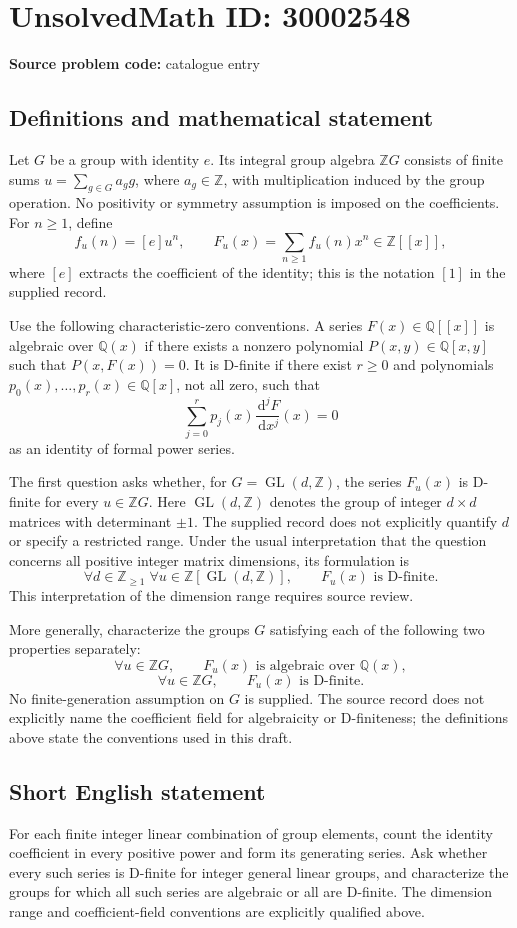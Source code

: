 \documentclass[11pt]{article}
\newcommand{\Z}{\mathbb{Z}}
\newcommand{\Q}{\mathbb{Q}}
\newcommand{\dd}{\,\mathrm{d}}
\begin{document}
\section*{UnsolvedMath ID: 30002548}
\textbf{Source problem code:} catalogue entry
\subsection{Definitions and mathematical statement}
Let \(G\) be a group with identity \(e\). Its integral group algebra \(\Z G\) consists of finite sums \(u=\sum_{g\in G}a_g g\), where \(a_g\in\Z\), with multiplication induced by the group operation. No positivity or symmetry assumption is imposed on the coefficients. For \(n\geq 1\), define
\[
f_u(n)=[e]u^n,\qquad F_u(x)=\sum_{n\geq 1}f_u(n)x^n\in\Z[[x]],
\]
where \([e]\) extracts the coefficient of the identity; this is the notation \([1]\) in the supplied record.

Use the following characteristic-zero conventions. A series \(F(x)\in\Q[[x]]\) is algebraic over \(\Q(x)\) if there exists a nonzero polynomial \(P(x,y)\in\Q[x,y]\) such that \(P(x,F(x))=0\). It is D-finite if there exist \(r\geq 0\) and polynomials \(p_0(x),\ldots,p_r(x)\in\Q[x]\), not all zero, such that
\[
\sum_{j=0}^{r}p_j(x)\frac{\dd^j F}{\dd x^j}(x)=0
\]
as an identity of formal power series.

The first question asks whether, for \(G=\operatorname{GL}(d,\Z)\), the series \(F_u(x)\) is D-finite for every \(u\in\Z G\). Here \(\operatorname{GL}(d,\Z)\) denotes the group of integer \(d\times d\) matrices with determinant \(\pm1\). The supplied record does not explicitly quantify \(d\) or specify a restricted range. Under the usual interpretation that the question concerns all positive integer matrix dimensions, its formulation is
\[
\forall d\in\Z_{\geq1}\;\forall u\in\Z[\operatorname{GL}(d,\Z)],\qquad F_u(x)\text{ is D-finite}.
\]
This interpretation of the dimension range requires source review.

More generally, characterize the groups \(G\) satisfying each of the following two properties separately:
\[
\forall u\in\Z G,\qquad F_u(x)\text{ is algebraic over }\Q(x),
\]
\[
\forall u\in\Z G,\qquad F_u(x)\text{ is D-finite}.
\]
No finite-generation assumption on \(G\) is supplied. The source record does not explicitly name the coefficient field for algebraicity or D-finiteness; the definitions above state the conventions used in this draft.
\subsection{Short English statement}
For each finite integer linear combination of group elements, count the identity coefficient in every positive power and form its generating series. Ask whether every such series is D-finite for integer general linear groups, and characterize the groups for which all such series are algebraic or all are D-finite. The dimension range and coefficient-field conventions are explicitly qualified above.
\end{document}
